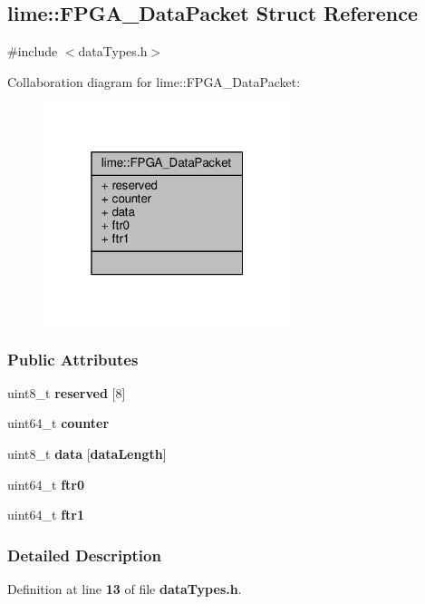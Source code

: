 \subsection{lime\+:\+:F\+P\+G\+A\+\_\+\+Data\+Packet Struct Reference}
\label{structlime_1_1FPGA__DataPacket}


{\ttfamily \#include $<$data\+Types.\+h$>$}



Collaboration diagram for lime\+:\+:F\+P\+G\+A\+\_\+\+Data\+Packet\+:
\nopagebreak
\begin{figure}[H]
\begin{center}
\leavevmode
\includegraphics[width=205pt]{d2/de2/structlime_1_1FPGA__DataPacket__coll__graph}
\end{center}
\end{figure}
\subsubsection*{Public Attributes}
\begin{DoxyCompactItemize}
\item 
uint8\+\_\+t {\bf reserved} [8]
\item 
uint64\+\_\+t {\bf counter}
\item 
uint8\+\_\+t {\bf data} [{\bf data\+Length}]
\item 
uint64\+\_\+t {\bf ftr0}
\item 
uint64\+\_\+t {\bf ftr1}
\end{DoxyCompactItemize}


\subsubsection{Detailed Description}


Definition at line {\bf 13} of file {\bf data\+Types.\+h}.



